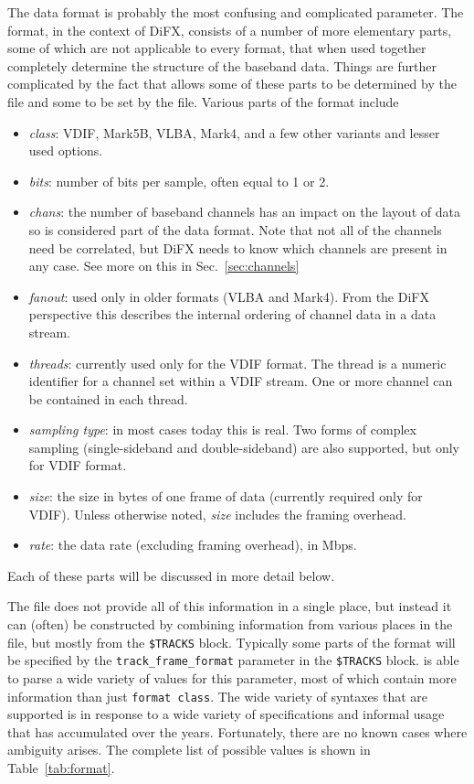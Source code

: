 \documentclass[12pt]{article}
\begin{document}
The data format is probably the most confusing and complicated parameter.
The format, in the context of DiFX, consists of a number of more elementary parts, some of which are not applicable to every format, that when used together completely determine the structure of the baseband data.
Things are further complicated by the fact that \vexdifx allows some of these parts to be determined by the \vx file and some to be set by the \vd file.
Various parts of the format include
\begin{itemize}
\item {\em class}: VDIF, Mark5B, VLBA, Mark4, and a few other variants and lesser used options.
\item {\em bits}: number of bits per sample, often equal to 1 or 2.
\item {\em chans}: the number of baseband channels has an impact on the layout of data so is considered part of the data format.  Note that not all of the channels need be correlated, but DiFX needs to know which channels are present in any case.  See more on this in Sec.~\ref{sec:channels}
\item {\em fanout}: used only in older formats (VLBA and Mark4).  From the DiFX perspective this describes the internal ordering of channel data in a data stream.
\item {\em threads}: currently used only for the VDIF format.  The thread is a numeric identifier for a channel set within a VDIF stream.  One or more channel can be contained in each thread.
\item {\em sampling type}: in most cases today this is real.  Two forms of complex sampling (single-sideband and double-sideband) are also supported, but only for VDIF format.
\item {\em size}: the size in bytes of one frame of data (currently required only for VDIF).  Unless otherwise noted, {\em size} includes the framing overhead.
\item {\em rate}: the data rate (excluding framing overhead), in Mbps.
\end{itemize}

\noindent
Each of these parts will be discussed in more detail below.

The \vx file does not provide all of this information in a single place, but instead it can (often) be constructed by combining information from various places in the \vx file, but mostly from the {\tt \$TRACKS} block.
Typically some parts of the format will be specified by the {\tt track\_frame\_format} parameter in the {\tt \$TRACKS} block.
\vexdifx is able to parse a wide variety of values for this parameter, most of which contain more information than just {\tt format class}.
The wide variety of syntaxes that are supported is in response to a wide variety of specifications and informal usage that has accumulated over the years.
Fortunately, there are no known cases where ambiguity arises.
The complete list of possible values is shown in Table~\ref{tab:format}.
\end{document}

